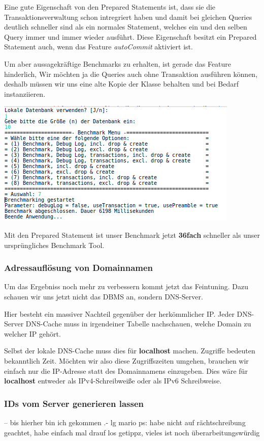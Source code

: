 Eine gute Eigenschaft von den Prepared Statements ist, dass sie die
Transaktionsverwaltung schon intregriert haben und damit bei gleichen Queries
deutlich schneller sind als ein normales Statement, welches ein und den selben
Query immer und immer wieder ausführt. Diese Eigenschaft besitzt ein
Prepared Statement auch, wenn das Feature \textit{autoCommit} aktiviert ist.

Um aber aussagekräftige Benchmarks zu erhalten, ist gerade das Feature
hinderlich, Wir möchten ja die Queries auch ohne Transaktion ausführen können,
deshalb müssen wir uns eine alte Kopie der Klasse behalten und bei Bedarf
instanziieren.
\begin{center}
\includegraphics{Bilder/Auswahl_016.png}
\end{center}
Mit den Prepared Statement ist unser Benchmark jetzt \textbf{36fach} schneller
als unser ursprüngliches Benchmark Tool.

\subsubsection{Adressauflösung von Domainnamen}
Um das Ergebniss noch mehr zu verbessern kommt jetzt das Feintuning. Dazu
schauen wir uns jetzt nicht das DBMS an, sondern DNS-Server.

Hier besteht ein massiver Nachteil gegenüber der herkömmlicher IP. Jeder
DNS-Server \bzw DNS-Cache muss in irgendeiner Tabelle nachschauen, welche Domain
zu welcher IP gehört. 

Selbst der lokale DNS-Cache muss dies \zB für \textbf{localhost} machen.
Zugriffe bedeuten bekanntlich Zeit. Möchten wir also diese Zugriffszeiten
umgehen, brauchen wir einfach nur die IP-Adresse statt des Domainnamens
einzugeben. Dies wäre für \textbf{localhost} entweder  als
IPv4-Schreibweiße oder \gqq{[::1]} als IPv6 Schreibweise.

\subsubsection{IDs vom Server generieren lassen}
-- bis hierher bin ich gekommen .- lg mario
ps: habe nicht auf rächtschreibung geachtet, habe einfach mal drauf los getippz,
vieles ist noch überarbeitungswürdig


